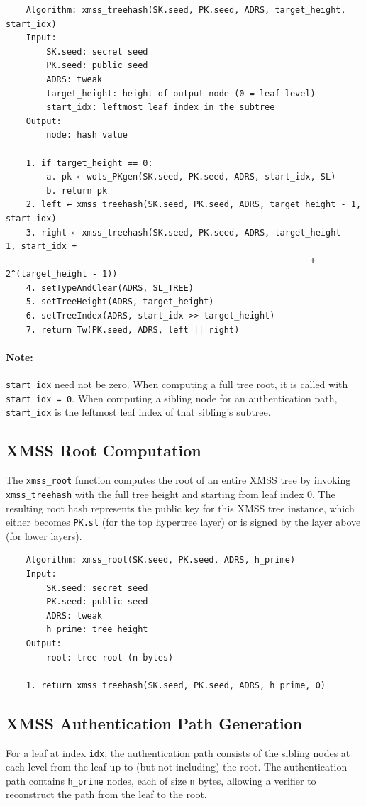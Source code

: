 \begin{verbatim}
    Algorithm: xmss_treehash(SK.seed, PK.seed, ADRS, target_height, start_idx)
    Input:
        SK.seed: secret seed
        PK.seed: public seed
        ADRS: tweak
        target_height: height of output node (0 = leaf level)
        start_idx: leftmost leaf index in the subtree
    Output:
        node: hash value

    1. if target_height == 0:
        a. pk ← wots_PKgen(SK.seed, PK.seed, ADRS, start_idx, SL)
        b. return pk
    2. left ← xmss_treehash(SK.seed, PK.seed, ADRS, target_height - 1, start_idx)
    3. right ← xmss_treehash(SK.seed, PK.seed, ADRS, target_height - 1, start_idx + 
                                                            + 2^(target_height - 1))
    4. setTypeAndClear(ADRS, SL_TREE)
    5. setTreeHeight(ADRS, target_height)
    6. setTreeIndex(ADRS, start_idx >> target_height)
    7. return Tw(PK.seed, ADRS, left || right)
\end{verbatim}

\paragraph{Note:} \texttt{start\_idx} need not be zero. When computing a full tree root, it is called with \texttt{start\_idx = 0}. When computing a sibling node for an authentication path, \texttt{start\_idx} is the leftmost leaf index of that sibling's subtree.

\subsection{XMSS Root Computation}
The \texttt{xmss\_root} function computes the root of an entire XMSS tree by invoking \texttt{xmss\_treehash} with the full tree height and starting from leaf index 0. The resulting root hash represents the public key for this XMSS tree instance, which either becomes \texttt{PK.sl} (for the top hypertree layer) or is signed by the layer above (for lower layers).
\begin{verbatim}
    Algorithm: xmss_root(SK.seed, PK.seed, ADRS, h_prime)
    Input:
        SK.seed: secret seed
        PK.seed: public seed
        ADRS: tweak
        h_prime: tree height
    Output:
        root: tree root (n bytes)

    1. return xmss_treehash(SK.seed, PK.seed, ADRS, h_prime, 0)
\end{verbatim}

\subsection{XMSS Authentication Path Generation}
For a leaf at index \texttt{idx}, the authentication path consists of the sibling nodes at each level from the leaf up to (but not including) the root. The authentication path contains \texttt{h\_prime} nodes, each of size \texttt{n} bytes, allowing a verifier to reconstruct the path from the leaf to the root.

